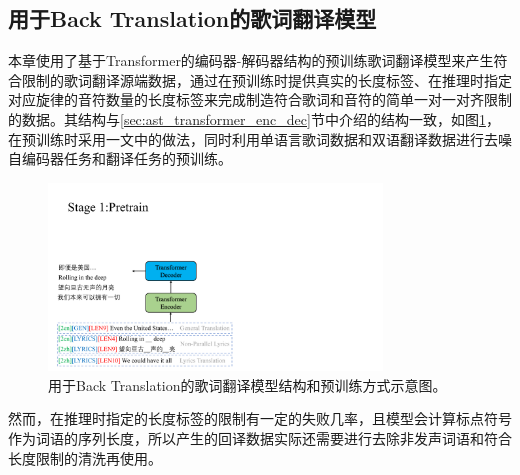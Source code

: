 \subsection{用于Back Translation的歌词翻译模型}
本章使用了基于Transformer的编码器-解码器结构的预训练歌词翻译模型来产生符合限制的歌词翻译源端数据，通过在预训练时提供真实的长度标签、在推理时指定对应旋律的音符数量的长度标签来完成制造符合歌词和音符的简单一对一对齐限制的数据。其结构与\ref{sec:ast_transformer_enc_dec}节中介绍的结构一致，如图\ref{fig:bt_model}，在预训练时采用\citet{gagast}一文中的做法，同时利用单语言歌词数据和双语翻译数据进行去噪自编码器任务和翻译任务的预训练。
\begin{figure}[!ht]
    \centering
    \includegraphics[width=0.79\textwidth]{figure/ast/backtrans_model.pdf}
    \caption{用于Back Translation的歌词翻译模型结构和预训练方式示意图。}
    \label{fig:bt_model}
\end{figure}
然而，在推理时指定的长度标签的限制有一定的失败几率，且模型会计算标点符号作为词语的序列长度，所以产生的回译数据实际还需要进行去除非发声词语和符合长度限制的清洗再使用。
